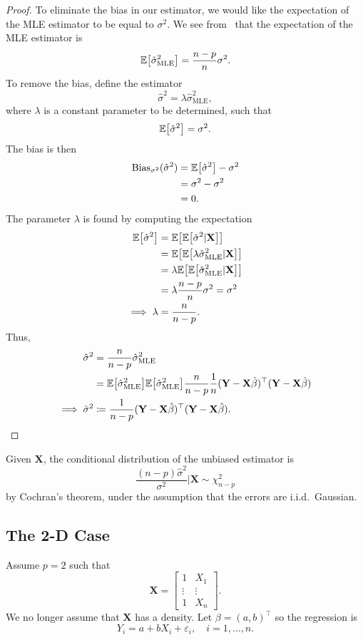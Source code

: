 \documentclass[letterpaper, reqno]{amsart}
\numberwithin{equation}{section}
\newcommand{\T}{\top} %
\newcommand{\vect}[1]{\boldsymbol{\mathbf{#1}}} %
\newcommand{\E}[1]{\mathbb{E}\mleft[#1\mright]}
\newcommand{\iid}{i.i.d.}
\newcommand{\Xm}{\vect{X}}
\newcommand{\Yv}{\vect{Y}}
\newcommand{\Bv}{\beta}
\newcommand{\Bvh}{\hat{\beta}}
\newcommand{\ve}{\varepsilon}
\begin{document}
\begin{proof}
  To eliminate the bias in our estimator, we would like the expectation of the MLE
  estimator to be equal to $\sigma^2$. We see from~ that the
  expectation of the MLE estimator is
  \[ \E{\hat{\sigma}^2_\mathrm{MLE}} = \frac{n-p}{n} \sigma^2. \]
  To remove the bias, define the estimator
  \[ \hat{\sigma}^2 = \lambda \hat{\sigma}^2_\mathrm{MLE}, \]
  where $\lambda$ is a constant parameter to be determined, such that
  \[ \E{\hat{\sigma}^2} = \sigma^2. \]
  The bias is then
  \begin{align*}
    \mathrm{Bias}_{\sigma^2}(\hat{\sigma}^2) &= \E{\hat{\sigma}^2} - \sigma^2 \\
    &= \sigma^2 - \sigma^2 \\
    &= 0.
  \end{align*}
  The parameter $\lambda$ is found by computing the expectation
  \begin{align*}
    \E{\hat{\sigma}^2} &= \E{\E{\hat{\sigma}^2 | \Xm}} \\
    &= \E{\E{\lambda \hat{\sigma}^2_\mathrm{MLE} | \Xm}} \\
    &= \lambda \E{\E{\hat{\sigma}^2_\mathrm{MLE} | \Xm}} \\
    &= \lambda \frac{n-p}{n} \sigma^2 = \sigma^2 \\
    \implies \lambda &= \frac{n}{n-p}.
  \end{align*}
  Thus,
  \begin{align*}
    \hat{\sigma}^2 &= \frac{n}{n-p} \hat{\sigma}^2_\mathrm{MLE} \\
    &= \E{\hat{\sigma}^2_\mathrm{MLE}}\E{\hat{\sigma}^2_\mathrm{MLE}}\frac{n}{n-p} \frac{1}{n}(\Yv - \Xm\Bvh)^\T(\Yv - \Xm\Bvh) \\
  \implies \hat{\sigma}^2  &\coloneqq \frac{1}{n-p} (\Yv - \Xm\Bvh)^\T(\Yv - \Xm\Bvh). \qedhere
  \end{align*}
\end{proof}

Given $\Xm$, the conditional distribution of the unbiased estimator is
\[ \frac{(n-p)\hat{\sigma}^2}{\sigma^2} \Big| \Xm \sim \chi^2_{n-p} \]
by Cochran's theorem, under the assumption that the errors are \iid\ Gaussian.

\subsection{The 2-D Case}
Assume $p = 2$ such that 
\begin{equation} \label{eq:Xm}
   \Xm = \begin{bmatrix} 1 & X_1 \\ \vdots & \vdots \\ 1 & X_n \end{bmatrix}.
\end{equation}
We no longer assume that $\Xm$ has a density. %
Let $\Bv = (a, b)^\T$ so the regression is
\[ Y_i = a + bX_i + \ve_i, \quad i = 1, \dots, n. \]
\end{document}
